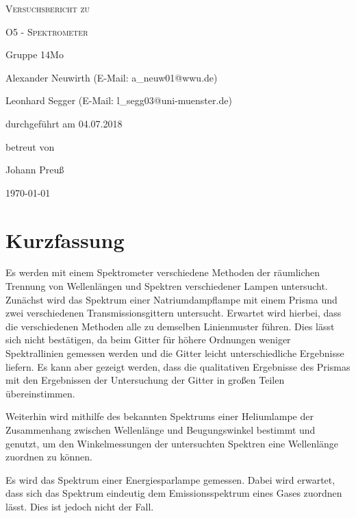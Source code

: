 \documentclass[
	a4paper,
	12pt,
	pagesize,
	ngerman
]{scrartcl}
\begin{document}
	
	\begin{titlepage}
		\centering
		{\scshape\LARGE Versuchsbericht zu \par}
		\vspace{1cm}
		{\scshape\huge O5 - Spektrometer \par}
		\vspace{2.5cm}
		{\LARGE Gruppe 14Mo \par}
		\vspace{0.5cm}
		
		{\large Alexander Neuwirth (E-Mail: a\_neuw01@wwu.de) \par}
		{\large Leonhard Segger (E-Mail: l\_segg03@uni-muenster.de) \par}
		\vfill
		
		durchgeführt am 04.07.2018\par
		betreut von\par
		{\large Johann Preuß} 
		
		\vfill
		
		{\large \today\par}
	\end{titlepage}
	\tableofcontents
	\newpage

	\section{Kurzfassung}
	Es werden mit einem Spektrometer verschiedene Methoden der räumlichen Trennung von Wellenlängen und Spektren verschiedener Lampen untersucht.
	Zunächst wird das Spektrum einer Natriumdampflampe mit einem Prisma und zwei verschiedenen Transmissionsgittern untersucht.
	Erwartet wird hierbei, dass die verschiedenen Methoden alle zu demselben Linienmuster führen.
	Dies lässt sich nicht bestätigen, da beim Gitter für höhere Ordnungen weniger Spektrallinien gemessen werden und die Gitter leicht unterschiedliche Ergebnisse liefern.
	Es kann aber gezeigt werden, dass die qualitativen Ergebnisse des Prismas  mit den Ergebnissen der Untersuchung der Gitter in großen Teilen übereinstimmen.
	
	Weiterhin wird mithilfe des bekannten Spektrums einer Heliumlampe der Zusammenhang zwischen Wellenlänge und Beugungswinkel bestimmt und genutzt, um den Winkelmessungen der untersuchten Spektren eine Wellenlänge zuordnen zu können.
	
	Es wird das Spektrum einer Energiesparlampe gemessen.
	Dabei wird erwartet, dass sich das Spektrum eindeutig dem Emissionsspektrum eines Gases zuordnen lässt.
	Dies ist jedoch nicht der Fall.
	
\end{document}
